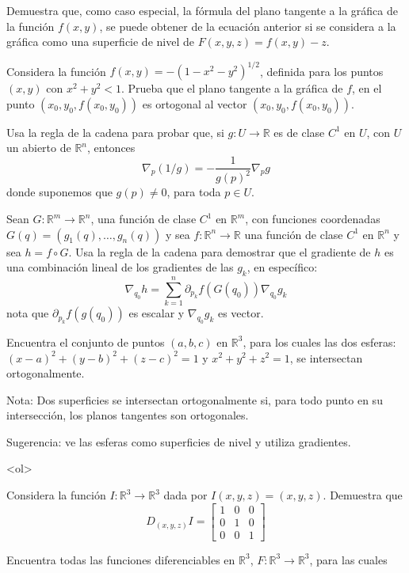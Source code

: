 \documentclass{article}
\theoremstyle{definition}
\begin{document}
    Demuestra que, como caso especial, la fórmula del plano tangente a la gráfica de la función
    $f(x,y)$, se puede obtener de la ecuación anterior si se considera a la gráfica
    como una superficie de nivel de $F(x,y,z)=f(x,y)-z$.
 
    
  \item Considera la función $f(x,y)=-(1-x^2-y^2)^{1/2}$, definida para los puntos $(x,y)$
    con $x^2+y^2<1$. Prueba que el plano tangente a la gráfica de $f$, en el punto $(x_0,y_0,f(x_0,y_0))$
    es ortogonal al vector $(x_0,y_0,f(x_0,y_0))$.

    \item Usa la regla de la cadena para probar que, si $g:U\to \mathbb{R}$ es de clase
      $C^1$ en $U$, con $U$ un abierto de $\mathbb{R}^n$, entonces
      $$
      \nabla_{p}(1/g)=-\frac{1}{g(p)^2}\nabla_p g
      $$    
      donde suponemos que $g(p)\ne 0$, para toda $p\in U$.
    
  \item Sean $G:\mathbb{R}^m \to \mathbb{R}^n$, una función de clase $C^1$ en $\mathbb{R}^m$, con funciones
    coordenadas $G(q)=(g_1(q),\dots, g_n(q))$ y sea $f:\mathbb{R}^n \to \mathbb{R}$ una función
    de clase $C^1$ en $\mathbb{R}^n$ y sea $h=f\circ G$. Usa la regla de la cadena para demostrar que
    el gradiente de $h$ es una combinación lineal de los gradientes de las $g_k$, en específico:
    $$
    \nabla_{q_0} h= \sum_{k=1}^n \partial_{p_k}f(G(q_0)) \nabla_{q_0}g_k
    $$
    nota que $\partial_{p_k}f(g(q_0))$ es escalar y $\nabla_{q_0}g_k$ es vector.


    \item Encuentra el conjunto de puntos $(a,b,c)$ en $\mathbb{R}^3$, para los cuales las
      dos esferas: $(x-a)^2+(y-b)^2+(z-c)^2=1$ y $x^2+y^2+z^2=1$, se intersectan ortogonalmente.

      Nota: Dos superficies se intersectan ortogonalmente si, para todo punto en su intersección,
      los planos tangentes son ortogonales. 

      Sugerencia: ve las esferas como superficies de nivel y utiliza gradientes. 

  \item
    <ol>
    \item Considera la función $I:\mathbb{R}^3\to \mathbb{R}^3$ dada por $I(x,y,z)=(x,y,z)$.
      Demuestra que
      $$
      D_{(x,y,z)}I=\left[
        \begin{array}{ccc}
          1 & 0 & 0 \\
          0 & 1 & 0 \\
          0 & 0 & 1
        \end{array}
      \right]
      $$
    \item Encuentra todas las funciones diferenciables en $\mathbb{R}^3$,
      $F:\mathbb{R}^3 \to \mathbb{R}^3$, para las cuales
\end{document}
